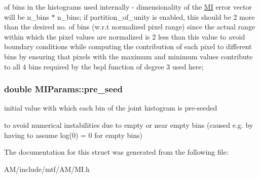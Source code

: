 of bins in the histograms used internally -\/ dimensionality of the \hyperlink{classMI}{M\-I} error vector will be n\-\_\-bins $\ast$ n\-\_\-bins; if partition\-\_\-of\-\_\-unity is enabled, this should be 2 more than the desired no. of bins (w.\-r.\-t normalized pixel range) since the actual range within which the pixel values are normalized is 2 less than this value to avoid boundary conditions while computing the contribution of each pixel to different bins by ensuring that pixels with the maximum and minimum values contribute to all 4 bins required by the bspl function of degree 3 used here; \hypertarget{structMIParams_a08f5a14dae9f3109340a5761812acfcf}{
\subsubsection[{pre\-\_\-seed}]{\setlength{\rightskip}{0pt plus 5cm}double M\-I\-Params\-::pre\-\_\-seed}}\label{structMIParams_a08f5a14dae9f3109340a5761812acfcf}


initial value with which each bin of the joint histogram is pre-\/seeded 

to avoid numerical instabilities due to empty or near empty bins (caused e.\-g. by having to assume log(0) = 0 for empty bins) 

The documentation for this struct was generated from the following file\-:\begin{DoxyCompactItemize}
\item 
A\-M/include/mtf/\-A\-M/M\-I.\-h\end{DoxyCompactItemize}
